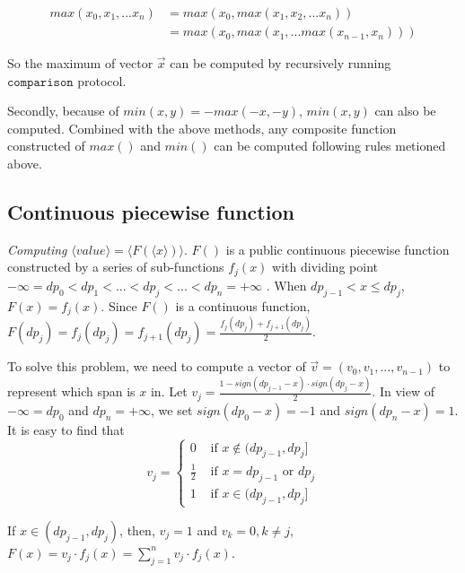 \documentclass[letterpaper]{article} %
\begin{document}
       \begin{align*}
           max(x_{0},x_{1},...x_{n}) &= max(x_{0},max(x_{1},x_{2},...x_{n})) \\
         &= max(x_{0},max(x_{1},...max(x_{n-1},x_{n})))
       \end{align*}
       
       So the maximum of vector $\overrightarrow{x}$ can be computed by recursively running $\mathtt{comparison}$ protocol.
       
       Secondly, because of $min(x,y)=-max(-x,-y)$,  $min(x,y)$ can also be computed.
       Combined with the above methods, 
       any composite function constructed of $max()$ and $min()$ can be computed following rules metioned above.
       
       
       
       
       
       
       \subsection{Continuous piecewise function}
       \emph{Computing} $\langle value\rangle  = \langle F(\langle x\rangle)\rangle $. 
       $F()$ is a public continuous piecewise function constructed by a series of sub-functions $f_{j}(x)$ 
       with dividing point $-\infty =dp_{0}<dp_{1}<...<dp_{j}<...<dp_{n}=+\infty$ . 
       When $dp_{j-1}< x\leq dp_{j}$, $F(x) =f_{j}(x)$.
       Since $F()$ is a continuous function, $F(dp_{j}) =f_{j}(dp_{j})=f_{j+1}(dp_{j})=\frac{f_{j}(dp_{j})+f_{j+1}(dp_{j})}{2}$.
       
    
       To solve this problem, we need to compute a vector of 
       $\overrightarrow{v}=(v_{0},v_{1},...,v_{n-1})$ to represent which span is $x$ in. 
       Let $v_{j} = \frac{1-sign(dp_{j-1}-x)\cdot sign(dp_{j}-x)}{2}$.
       In view of $-\infty =dp_{0}$ and $dp_{n}=+\infty$,
       we set $sign(dp_{0}-x)=-1$ and $sign(dp_{n}-x)=1$.
       It is easy to find that
       $$v_{j}=\begin{cases}
           0 & \text{ if } x\notin (dp_{j-1},dp_{j}] \\  
           \frac{1}{2} & \text{ if } x = dp_{j-1} \text{ or } dp_{j}\\ 
           1 & \text{ if } x\in (dp_{j-1},dp_{j}] 
          \end{cases}$$
       
       If $x\in (dp_{j-1},dp_{j})$, then, $v_{j}=1$ and $v_{k}=0,k\neq j$,$F(x)=v_{j}\cdot f_{j}(x)=\sum_{j=1}^{n}v_{j}\cdot f_{j}(x)$.
       
\end{document}
